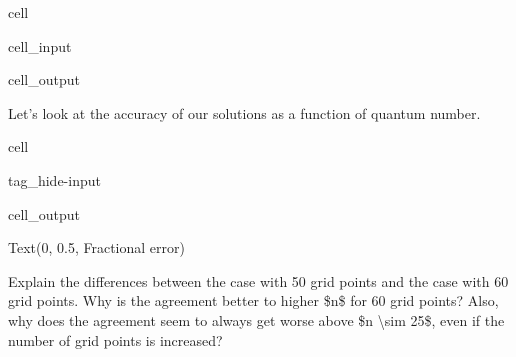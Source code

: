 \documentclass[letterpaper,10pt,english]{jupyterBook}
\begin{document}
\begin{sphinxuseclass}{cell}\begin{sphinxVerbatimInput}

\begin{sphinxuseclass}{cell_input}
\begin{sphinxVerbatim}[commandchars=\\\{\}]
\PYG{p}{[}\PYG{p}{]}
\end{sphinxVerbatim}

\end{sphinxuseclass}\end{sphinxVerbatimInput}
\begin{sphinxVerbatimOutput}

\begin{sphinxuseclass}{cell_output}
\begin{sphinxVerbatim}
\end{sphinxVerbatim}

\noindent{}

\end{sphinxuseclass}\end{sphinxVerbatimOutput}

\end{sphinxuseclass}
\sphinxAtStartPar
Let’s look at the accuracy of our solutions as a function of quantum number.

\begin{sphinxuseclass}{cell}
\begin{sphinxuseclass}{tag_hide-input}\begin{sphinxVerbatimOutput}

\begin{sphinxuseclass}{cell_output}
\begin{sphinxVerbatim}[commandchars=\\\{\}]
Text(0, 0.5, \PYGZsq{}Fractional error\PYGZsq{})
\end{sphinxVerbatim}

\noindent{}

\end{sphinxuseclass}\end{sphinxVerbatimOutput}

\end{sphinxuseclass}
\end{sphinxuseclass}
\sphinxAtStartPar
{} Explain the differences between the case with 50 grid points and the case with 60 grid points. Why is the agreement better to higher \$n\$ for 60 grid points? Also, why does the agreement seem to always get worse above \$n \textbackslash{}sim 25\$, even if the number of grid points is increased?
\end{document}
